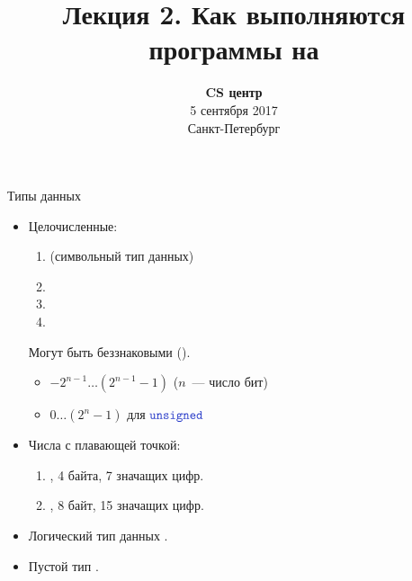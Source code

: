 \documentclass[aspectration=1610,t]{beamer}
\title{Лекция 2. Как выполняются программы на \langcpp}
\date{
   \textbf{CS центр}\\
   5 сентября 2017 \\
   Санкт-Петербург
}
\begin{document}
\begin{frame} 
  \titlepage
\end{frame}

\begin{frame}[fragile]{Типы данных}
\begin{itemize}
    \item Целочисленные:
        \begin{enumerate}
            \item {} (символьный тип данных)
            \item {}
            \item {}
            \item {}
        \end{enumerate}
    Могут быть беззнаковыми ().
    \begin{itemize}
        \item $-2^{n-1}\ldots (2^{n-1} - 1)$ ($n$~--- число бит)
        \item $0\ldots (2^{n} - 1)$ для $\code{unsigned}$
    \end{itemize}

    \item Числа с плавающей точкой:
        \begin{enumerate}
            \item {}, 4 байта, 7 значащих цифр.
            \item {}, 8 байт, 15 значащих цифр.
        \end{enumerate}
    \item Логический тип данных .
        
    \item Пустой тип .
\end{itemize}
\end{frame}
\end{document}
